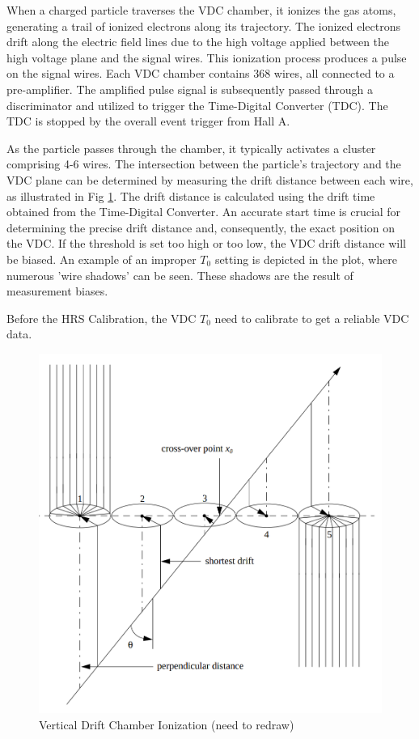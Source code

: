 When a charged particle traverses the VDC chamber, it ionizes the gas atoms, generating a trail of ionized electrons along its trajectory. The ionized electrons drift along the electric field lines due to the high voltage applied between the high voltage plane and the signal wires. This ionization process produces a pulse on the signal wires. Each VDC chamber contains 368 wires, all connected to a pre-amplifier. The amplified pulse signal is subsequently passed through a discriminator and utilized to trigger the Time-Digital Converter (TDC). The TDC is stopped by the overall event trigger from Hall A.

As the particle passes through the chamber, it typically activates a cluster comprising 4-6 wires. The intersection between the particle's trajectory and the VDC plane can be determined by measuring the drift distance between each wire, as illustrated in Fig \ref{fig:vdc_wire_ionization_cluster}. The drift distance is calculated using the drift time obtained from the Time-Digital Converter. An accurate start time is crucial for determining the precise drift distance and, consequently, the exact position on the VDC. If the threshold is set too high or too low, the VDC drift distance will be biased. An example of an improper $T_0$ setting is depicted in the plot, where numerous 'wire shadows' can be seen. These shadows are the result of measurement biases. 

Before the HRS Calibration, the VDC $T_0$ need to calibrate to get a reliable VDC data. 
\begin{figure}[!htbp]
    \centering
    \includegraphics[scale = 0.25]{images/chap4/vdc_wire_ionize.png}
    \caption{Vertical Drift Chamber Ionization (need to redraw)}
    \label{fig:vdc_wire_ionization_cluster}
\end{figure}

